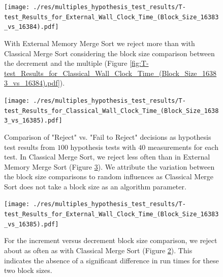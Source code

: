 \documentclass[twocolumn]{article}
\begin{document}
\begin{figure}[htb]
    \begin{minipage}{0.475 \textwidth}
        \centering
        \texttt{[image: ./res/multiples\_hypothesis\_test\_results/T-test\_Results\_for\_External\_Wall\_Clock\_Time\_(Block\_Size\_16383\_vs\_16384).pdf]}
        \caption{With External Memory Merge Sort we reject more than with Classical Merge Sort considering the block size comparison between the decrement and the multiple (Figure \ref{fig:T-test_Results_for_Classical_Wall_Clock_Time_(Block_Size_16383_vs_16384).pdf}).}
        \label{fig:T-test_Results_for_External_Wall_Clock_Time_(Block_Size_16383_vs_16384).pdf}
    \end{minipage}
\end{figure}

\begin{figure}[htb]
    \begin{minipage}{0.475 \textwidth}
        \centering
        \texttt{[image: ./res/multiples\_hypothesis\_test\_results/T-test\_Results\_for\_Classical\_Wall\_Clock\_Time\_(Block\_Size\_16383\_vs\_16385).pdf]}
        \caption{Comparison of "Reject" vs. "Fail to Reject" decisions as hypothesis test results from \( 100 \) hypothesis tests with \( 40 \) measurements for each test.
            In Classical Merge Sort, we reject less often than in External Memory Merge Sort (Figure \ref{fig:T-test_Results_for_External_Wall_Clock_Time_(Block_Size_16383_vs_16385).pdf}).
            We attribute the variation between the block size comparisons to random influences as Classical Merge Sort does not take a block size as an algorithm parameter.}
        \label{fig:T-test_Results_for_Classical_Wall_Clock_Time_(Block_Size_16383_vs_16385).pdf}
    \end{minipage}
\end{figure}

\begin{figure}[htb]
    \begin{minipage}{0.475 \textwidth}
        \centering
        \texttt{[image: ./res/multiples\_hypothesis\_test\_results/T-test\_Results\_for\_External\_Wall\_Clock\_Time\_(Block\_Size\_16383\_vs\_16385).pdf]}
        \caption{For the increment versus decrement block size comparison, we reject about as often as with Classical Merge Sort (Figure \ref{fig:T-test_Results_for_Classical_Wall_Clock_Time_(Block_Size_16383_vs_16385).pdf}). This indicates the absence of a significant difference in run times for these two block sizes.}
        \label{fig:T-test_Results_for_External_Wall_Clock_Time_(Block_Size_16383_vs_16385).pdf}
    \end{minipage}
\end{figure}
\end{document}
